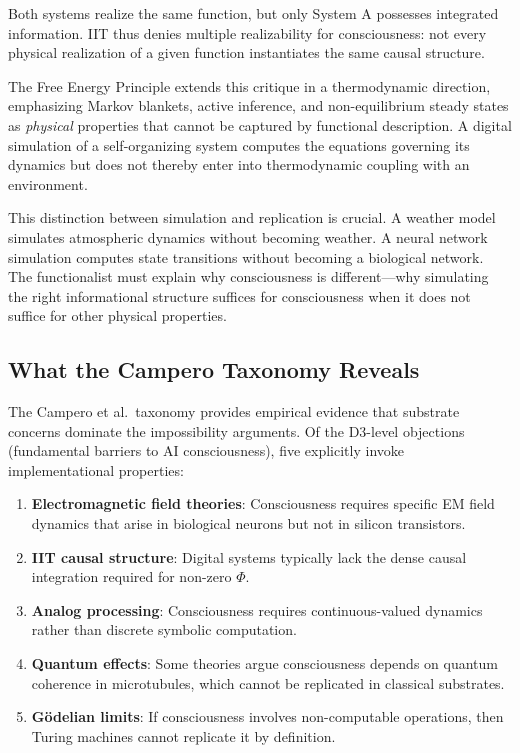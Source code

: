Both systems realize the same function, but only System A possesses integrated information.
IIT thus denies multiple realizability for consciousness: not every physical realization of
a given function instantiates the same causal structure.

The Free Energy Principle \cite{friston2010free, wiese2024fep} extends this critique in a
thermodynamic direction, emphasizing Markov blankets, active inference, and non-equilibrium
steady states as \emph{physical} properties that cannot be captured by functional description.
A digital simulation of a self-organizing system computes the equations governing its dynamics
but does not thereby enter into thermodynamic coupling with an environment.

This distinction between simulation and replication is crucial. A weather model simulates
atmospheric dynamics without becoming weather. A neural network simulation computes state
transitions without becoming a biological network. The functionalist must explain why
consciousness is different---why simulating the right informational structure suffices for
consciousness when it does not suffice for other physical properties.

\subsection{What the Campero Taxonomy Reveals}

The Campero et al.\ taxonomy \cite{campero2025taxonomy} provides empirical evidence that
substrate concerns dominate the impossibility arguments. Of the D3-level objections
(fundamental barriers to AI consciousness), five explicitly invoke implementational
properties:

\begin{enumerate}[leftmargin=2em]
\item \textbf{Electromagnetic field theories}: Consciousness requires specific EM field
      dynamics that arise in biological neurons but not in silicon transistors.
\item \textbf{IIT causal structure}: Digital systems typically lack the dense causal
      integration required for non-zero $\Phi$.
\item \textbf{Analog processing}: Consciousness requires continuous-valued dynamics rather
      than discrete symbolic computation.
\item \textbf{Quantum effects}: Some theories argue consciousness depends on quantum
      coherence in microtubules, which cannot be replicated in classical substrates.
\item \textbf{G\"{o}delian limits}: If consciousness involves non-computable operations,
      then Turing machines cannot replicate it by definition.
\end{enumerate}

